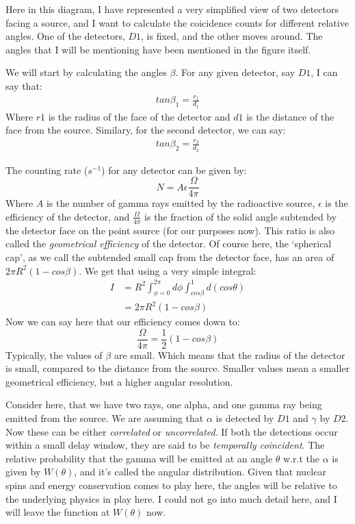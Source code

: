 \documentclass{double}
\begin{document}
\begin{multicols*}{2}
Here in this diagram, I have represented a very simplified
view of two detectors facing a source, and I want to
calculate the coicidence counts for different relative
angles. One of the detectors, $D1$, is fixed, and the other
moves around. The angles that I will be mentioning have been
mentioned in the figure itself. 

We will start by calculating the angles $\beta$. For any
given detector, say $D1$, I can say that:
\begin{align}
   tan \beta_1 = \frac{r_1}{d_1}
\end{align}
\noindent Where $r1$ is the radius of the face of the detector and
$d1$ is the distance of the face from the source. Similary,
for the second detector, we can say:
\begin{align}
   tan \beta_2 = \frac{r_2}{d_2}
\end{align}

\noindent The counting rate ($s^{-1}$) for any detector can
be given by:
\begin{equation}
    N = A\epsilon \frac{\Omega}{4\pi}
\end{equation}
\noindent Where $A$ is the number of gamma rays emitted by
the radioactive source, $\epsilon$ is the efficiency of the
detector, and $\frac{\Omega}{4\pi}$ is the fraction of the
solid angle subtended by the detector face on the point
source (for our purposes now). This ratio is also called the
\emph{geometrical efficiency} of the detector. Of course
here, the `spherical cap', as we call the subtended small
cap from the detector face, has an area of $2\pi
R^2(1-cos\beta)$. We get that using a very simple integral:
\begin{align}
    I &= R^2 \int_{\phi = 0}^{2\pi} d\phi \int _{cos \beta}^{1}
    d(cos\theta) \nonumber\\
    &= 2\pi R^2 (1 - cos\beta)
\end{align}
\noindent Now we can say here that our efficiency comes down
to:
\begin{equation}
    \frac{\Omega}{4\pi} = \frac{1}{2}(1-cos\beta)
\end{equation}
\noindent Typically, the values of $\beta$ are small. Which
means that the radius of the detector is small, compared to
the distance from the source. Smaller values mean a smaller
geometrical efficiency, but a higher angular resolution.

Consider here, that we have two rays, one alpha, and one
gamma ray being emitted from the source. We are assuming
that $\alpha$ is detected by $D1$ and $\gamma$ by $D2$. Now
these can be either \emph{correlated} or
\emph{uncorrelated}. If both the detections occur within a
small delay window, they are said to be \emph{temporally
coincident}. The relative probability that the gamma will be
emitted at an angle $\theta$ w.r.t the $\alpha$ is given by
$W(\theta)$, and it's called the angular distribution. Given
that nuclear spins and energy conservation comes to play
here, the angles will be relative to the underlying physics
in play here. I could not go into much detail here, and I
will leave the function at $W(\theta)$ now. 


\end{multicols*}
\end{document}
